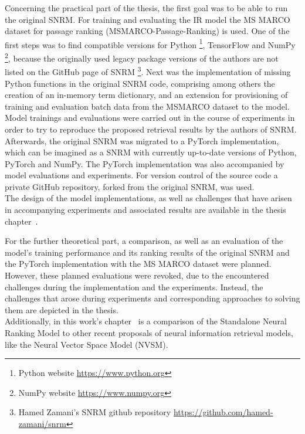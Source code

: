 Concerning the practical part of the thesis, the first goal was to be able 
    to run the original SNRM.
For training and evaluating the IR model the MS MARCO dataset
    for passage ranking (MSMARCO-Passage-Ranking) is used.
One of the first steps was to find compatible
    versions for Python 
    \footnote{Python website \url{https://www.python.org}}, 
    TensorFlow and NumPy
    \footnote{NumPy website \url{https://www.numpy.org}},
    because the originally used legacy package versions of the authors are not
    listed on the GitHub page of SNRM 
    \footnote{Hamed Zamani's SNRM github repository \url{https://github.com/hamed-zamani/snrm}}.
Next was the implementation of missing Python functions in the original SNRM code, 
    comprising among others the creation of an in-memory term dictionary, 
    and an extension for provisioning of training and evaluation batch data from the 
    MSMARCO dataset to the model.
Model trainings and evaluations were carried out in the course of experiments 
    in order to try to reproduce the proposed retrieval results by the authors of SNRM.\\
Afterwards, the original SNRM was migrated to a PyTorch implementation,
    which can be imagined as a SNRM with currently up-to-date versions of 
    Python, PyTorch and NumPy.
The PyTorch implementation was also accompanied by model evaluations and experiments.
For version control of the source code a private GitHub repository, forked from 
    the original SNRM, was used.\\
The design of the model implementations, as well as 
    challenges that have arisen in accompanying experiments and associated results 
    are available in the 
    thesis chapter~.

For the further theoretical part, a comparison, as well as an evaluation of the model's
    training performance and its ranking results of the original SNRM and 
    the PyTorch implementation with the MS MARCO dataset 
    were planned. 
However, these planned evaluations were revoked,
    due to the encountered challenges during the implementation and the experiments.
Instead, the challenges that arose during experiments 
    and corresponding approaches to solving them are depicted in the thesis.\\
Additionally, in this work's chapter~ 
    is a comparison of the Standalone Neural Ranking Model to other 
    recent proposals of neural information retrieval models,
    like the Neural Vector Space Model (NVSM).

